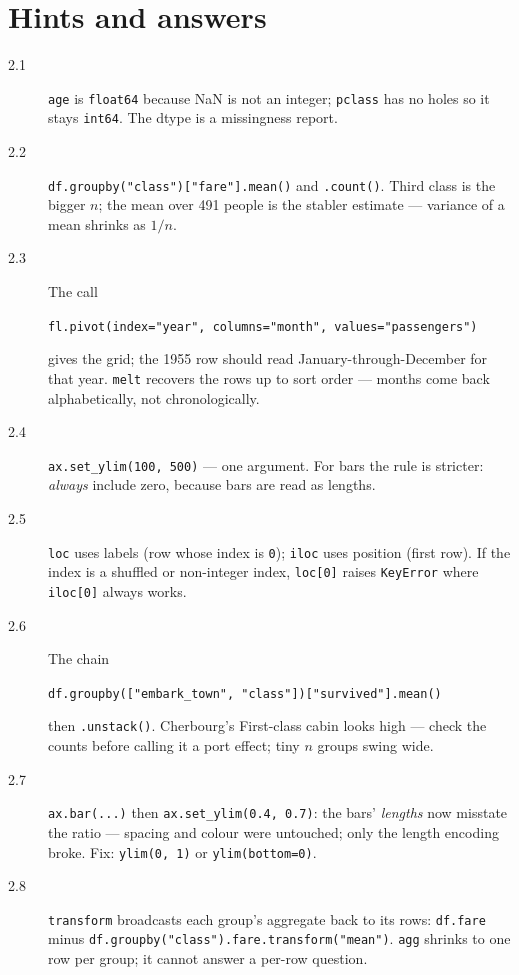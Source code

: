 \section*{Hints and answers}
\begin{description}
\item[2.1] \texttt{age} is \texttt{float64} because NaN is not an integer;
  \texttt{pclass} has no holes so it stays \texttt{int64}. The dtype is a
  missingness report.
\item[2.2] \texttt{df.groupby("class")["fare"].mean()} and
  \texttt{.count()}. Third class is the bigger $n$; the mean over 491
  people is the stabler estimate --- variance of a mean shrinks as $1/n$.
\item[2.3] The call
  \par\texttt{fl.pivot(index="year", columns="month", values="passengers")}
  \par\noindent gives the grid; the 1955 row should read
  January-through-December for that year. \texttt{melt} recovers the rows
  up to sort order --- months come back alphabetically, not
  chronologically.
\item[2.4] \texttt{ax.set\_ylim(100, 500)} --- one argument. For bars the
  rule is stricter: \emph{always} include zero, because bars are read as
  lengths.
\item[2.5] \texttt{loc} uses labels (row whose index is \texttt{0});
  \texttt{iloc} uses position (first row). If the index is a shuffled or
  non-integer index, \texttt{loc[0]} raises \texttt{KeyError} where
  \texttt{iloc[0]} always works.
\item[2.6] The chain
  \par\texttt{df.groupby(["embark\_town", "class"])["survived"].mean()}
  \par\noindent then \texttt{.unstack()}. Cherbourg's First-class cabin
  looks high --- check the counts before calling it a port effect; tiny
  $n$ groups swing wide.
\item[2.7] \texttt{ax.bar(...)} then
  \texttt{ax.set\_ylim(0.4, 0.7)}: the bars' \emph{lengths} now misstate
  the ratio --- spacing and colour were untouched; only the length
  encoding broke. Fix: \texttt{ylim(0, 1)} or \texttt{ylim(bottom=0)}.
\item[2.8] \texttt{transform} broadcasts each group's aggregate back to
  its rows: \texttt{df.fare} minus
  \texttt{df.groupby("class").fare.transform("mean")}. \texttt{agg}
  shrinks to one row per group; it cannot answer a per-row question.

\end{description}
